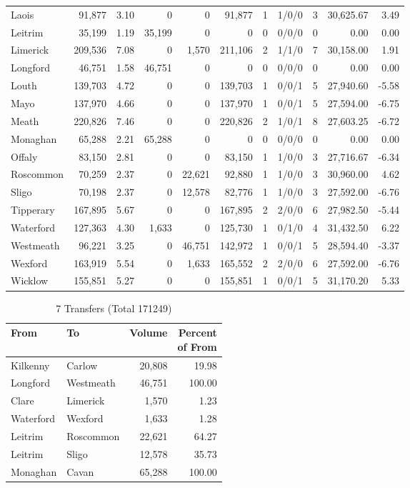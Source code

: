 \documentclass[a4paper]{article}
\begin{document}
\begin{longtable}{lrrrrrrlrrr}
Laois&91,877& 3.10&0&0&91,877&1&1/0/0&3&30,625.67& 3.49\\ 
Leitrim&35,199& 1.19&35,199&0&0&0&0/0/0&0& 0.00& 0.00\\ 
Limerick&209,536& 7.08&0&1,570&211,106&2&1/1/0&7&30,158.00& 1.91\\ 
Longford&46,751& 1.58&46,751&0&0&0&0/0/0&0& 0.00& 0.00\\ 
Louth&139,703& 4.72&0&0&139,703&1&0/0/1&5&27,940.60&-5.58\\ 
Mayo&137,970& 4.66&0&0&137,970&1&0/0/1&5&27,594.00&-6.75\\ 
Meath&220,826& 7.46&0&0&220,826&2&1/0/1&8&27,603.25&-6.72\\ 
Monaghan&65,288& 2.21&65,288&0&0&0&0/0/0&0& 0.00& 0.00\\ 
Offaly&83,150& 2.81&0&0&83,150&1&1/0/0&3&27,716.67&-6.34\\ 
Roscommon&70,259& 2.37&0&22,621&92,880&1&1/0/0&3&30,960.00& 4.62\\ 
Sligo&70,198& 2.37&0&12,578&82,776&1&1/0/0&3&27,592.00&-6.76\\ 
Tipperary&167,895& 5.67&0&0&167,895&2&2/0/0&6&27,982.50&-5.44\\ 
Waterford&127,363& 4.30&1,633&0&125,730&1&0/1/0&4&31,432.50& 6.22\\ 
Westmeath&96,221& 3.25&0&46,751&142,972&1&0/0/1&5&28,594.40&-3.37\\ 
Wexford&163,919& 5.54&0&1,633&165,552&2&2/0/0&6&27,592.00&-6.76\\ 
Wicklow&155,851& 5.27&0&0&155,851&1&0/0/1&5&31,170.20& 5.33\\ 
\end{longtable}

\begin{table}[htbp]
\caption{7 Transfers (Total 171249)}
\centering
\begin{tabular}{llrr} \toprule
From &To &Volume &\shortstack{Percent\\of From} \\ \midrule
Kilkenny&Carlow&20,808&19.98\\ 
Longford&Westmeath&46,751&100.00\\ 
Clare&Limerick&1,570& 1.23\\ 
Waterford&Wexford&1,633& 1.28\\ 
Leitrim&Roscommon&22,621&64.27\\ 
Leitrim&Sligo&12,578&35.73\\ 
Monaghan&Cavan&65,288&100.00\\ 
\bottomrule
\end{tabular}
\end{table}
\end{document}
